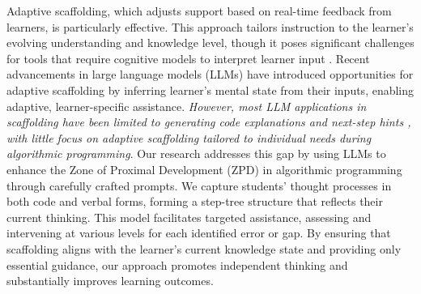 Adaptive scaffolding, which adjusts support based on real-time feedback from learners, is particularly effective. This approach tailors instruction to the learner’s evolving understanding and knowledge level, though it poses significant challenges for tools that require cognitive models to interpret learner input \cite{aleven2002effective, conati2000toward, vanlehn2011relative}.
Recent advancements in large language models (LLMs) have introduced opportunities for adaptive scaffolding by inferring learner's mental state from their inputs, enabling adaptive, learner-specific assistance. \emph{However, most LLM applications in scaffolding have been limited to generating code explanations and next-step hints \cite{macneil2023experiences, roest2024next}, with little focus on adaptive scaffolding tailored to individual needs during algorithmic programming}. Our research addresses this gap by using LLMs to enhance the Zone of Proximal Development (ZPD) \cite{chaiklin2003zone} in algorithmic programming through carefully crafted prompts. We capture students' thought processes in both code and verbal forms, forming a step-tree structure that reflects their current thinking. This model facilitates targeted assistance, assessing and intervening at various levels for each identified error or gap. By ensuring that scaffolding aligns with the learner's current knowledge state and providing only essential guidance, our approach promotes independent thinking and substantially improves learning outcomes.






